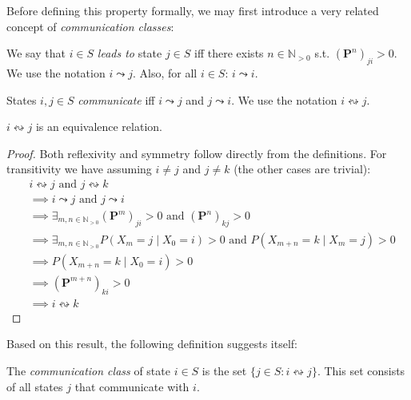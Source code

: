 \documentclass[../../main.tex]{subfiles}
\begin{document}
Before defining this property formally, we may first introduce a very related concept of \emph{communication classes}:

\begin{definition}
    We say that $i \in S$ \emph{leads to} state $j \in S$ iff there exists $n \in \mathbb{N}_{>0}$ s.t. $(\bm{P}^n)_{ji} > 0$. We use the notation $i \leadsto j$. Also, for all $i \in S$: $i \leadsto i$. 
\end{definition}

\begin{definition}
    States $i,j \in S$ \emph{communicate} iff $i \leadsto j$ and $j \leadsto i$. We use the notation $i \leftrightsquigarrow j$.
\end{definition}

\begin{theorem}
    $i \leftrightsquigarrow j$ is an equivalence relation.
\end{theorem}
\vspace{-2.5em}
\begin{proof}
    Both reflexivity and symmetry follow directly from the definitions. For transitivity we have assuming $i \neq j$ and $j \neq k$ (the other cases are trivial):
    \begin{align*}
        &i \leftrightsquigarrow j \text{ and } j \leftrightsquigarrow k \\
        &\implies i \leadsto j \text{ and } j \leadsto i \\
        &\implies \exists_{m,n \in \mathbb{N}_{>0}} (\bm{P}^m)_{ji} > 0 \text{ and } (\bm{P}^n)_{kj} > 0 \\
        &\implies \exists_{m,n \in \mathbb{N}_{>0}} P(X_m = j \mid X_0 = i) > 0 \text{ and } P(X_{m+n} = k \mid X_m = j) > 0 \\
        &\implies P(X_{m+n} = k \mid X_0 = i) > 0 \\
        &\implies (\bm{P}^{m+n})_{ki} > 0 \\
        &\implies i \leftrightsquigarrow k
    \end{align*}
\end{proof}

Based on this result, the following definition suggests itself:

\begin{definition}
    The \emph{communication class} of state $i \in S$ is the set $\{ j \in S : i \leftrightsquigarrow j \}$. This set consists of all states $j$ that communicate with $i$.
\end{definition}
\end{document}
